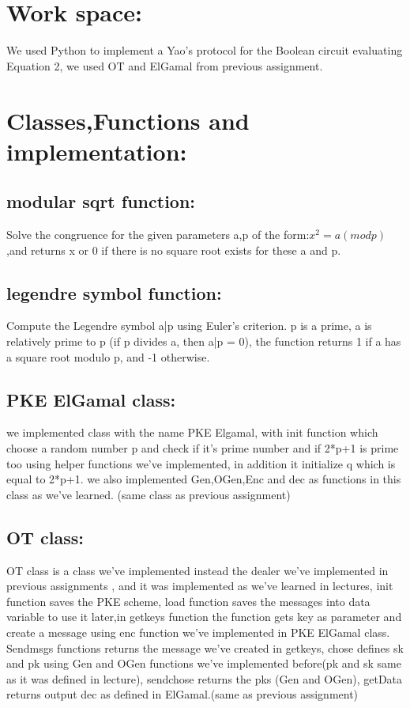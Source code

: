 \documentclass{article}
\begin{document}
\section*{Work space:}
We used Python to implement a Yao’s protocol for the Boolean circuit evaluating Equation 2, we used OT and ElGamal from previous assignment.
\section*{Classes,Functions and implementation:}
\subsection*{modular sqrt function:} Solve the congruence for the given parameters a,p of the form:$ x^2 = a (mod p)$ ,and returns x or 0 if there is no square root exists for these a and p.
\subsection*{legendre symbol function:}Compute the Legendre symbol  a|p using Euler's criterion. p is a prime, a is relatively prime to p (if p divides a, then a|p = 0), the function returns 1 if a has a square root modulo p, and -1 otherwise.
\subsection*{PKE ElGamal class:}
we implemented class with the name PKE Elgamal, with init function which choose a random number  p and check if it's prime number  and if 2*p+1 is prime too using helper functions we've implemented, in addition it initialize q which is equal to 2*p+1.
we also implemented Gen,OGen,Enc and dec as functions in this class as we've learned. (same class as previous assignment)
\subsection*{OT class:}
OT class is a class we've implemented instead the dealer we've implemented in previous assignments , and it was implemented as we've learned in lectures, init function saves the PKE scheme, load function saves the messages into data variable to use it later,in getkeys function the function gets key as parameter and create a message using enc function we've implemented in PKE ElGamal class.
Sendmsgs functions returns the message we've created in getkeys, chose defines sk and pk using Gen and OGen functions we've implemented before(pk and sk same as it was defined in lecture), sendchose returns the pks (Gen and OGen), getData returns output dec as defined in ElGamal.(same as previous assignment)
\end{document}
